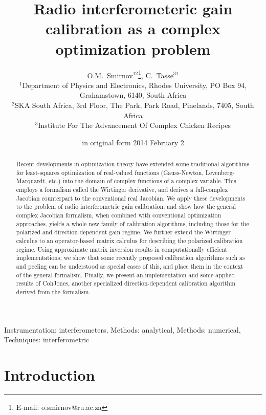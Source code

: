 \documentclass[useAMS,usenatbib]{mn2e}
\title[Radio interferometeric gain calibration as a complex optimization problem]{Radio interferometeric gain calibration as a complex optimization problem}
\author[O.M.~Smirnov \& C.~Tasse]{O.M.~Smirnov$^{12}$\thanks{E-mail: o.smirnov@ru.ac.za}, C.~Tasse$^{31}$\\
$^1$Department of Physics and Electronics, Rhodes University, PO Box 94, Grahamstown, 6140, South Africa\\
$^2$SKA South Africa, 3rd Floor, The Park, Park Road, Pinelands, 7405, South Africa\\
$^3$Institute For The Advancement Of Complex Chicken Recipes}
\newcommand{\StefCal}{{\sc StefCal}}
\begin{document}
\date{in original form 2014 February 2}

\pagerange{\pageref{firstpage}--\pageref{lastpage}} 

\maketitle

\label{firstpage}

\begin{abstract}
Recent developments in optimization theory have extended some traditional algorithms for least-squares optimization of 
real-valued functions (Gauss-Newton, Levenberg-Marquardt, etc.) into the domain of complex functions of a complex 
variable. This employs a formalism called the Wirtinger derivative, and derives a full-complex Jacobian counterpart 
to the conventional real Jacobian. We apply these developments to the problem of radio interferometric gain 
calibration, and show how the general complex Jacobian formalism, when combined with conventional optimization 
approaches, yields a whole new family of calibration algorithms, including those for the polarized and 
direction-dependent gain regime. We further extend the Wirtinger calculus to an operator-based matrix calculus 
for describing the polarized calibration regime. Using approximate matrix 
inversion results in computationally efficient implementations; we show that some recently proposed calibration algorithms 
such as {\sc \StefCal} and peeling can be understood as special cases of this, and place them in the context of the general 
formalism. Finally, we present an implementation and some applied results of {\sc CohJones}, another specialized 
direction-dependent calibration algorithm derived from the formalism.

\end{abstract}

\begin{keywords}
Instrumentation: interferometers, Methods: analytical, Methods: numerical, Techniques: interferometric
\end{keywords}

\section*{Introduction}
\end{document}
